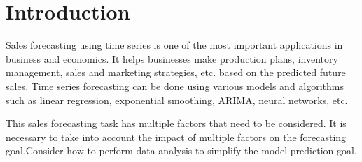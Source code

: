 
\section{Introduction}\label{sec-intro}














Sales forecasting using time series is one of the most important applications in business and economics. It helps businesses make production plans, inventory management, sales and marketing strategies, etc. based on the predicted future sales. Time series forecasting can be done using various models and algorithms such as linear regression, exponential smoothing, ARIMA, neural networks, etc. 



This sales forecasting task has multiple factors that need to be considered. It is necessary to take into account the impact of multiple factors on the forecasting goal.Consider how to perform data analysis to simplify the model prediction goal.








